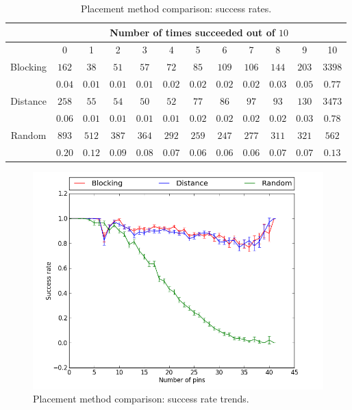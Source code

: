 \begin{table}[H]
\begin{center}
\begin{singlespace}
\begin{tabular}{|c||c|c|c|c|c|c|c|c|c|c|c|}
\hline
 & \multicolumn{11}{|c|}{Number of times succeeded out of $10$} \\
\hline
 & 0 & 1 & 2 & 3 & 4 & 5 & 6 & 7 & 8 & 9 & 10 \\
\hline\hline
Blocking & $162$ & $38$ & $51$ & $57$ & $72$ & $85$ & $109$ & $106$ & $144$ & $203$ & $3398$ \\
 & $0.04$ & $0.01$ & $0.01$ & $0.01$ & $0.02$ & $0.02$ & $0.02$ & $0.02$ & $0.03$ & $0.05$ & $0.77$ \\
\hline
 Distance & $258$ & $55$ & $54$ & $50$ & $52$ & $77$ & $86$ & $97$ & $93$ & $130$ & $3473$ \\
  & $0.06$ & $0.01$ & $0.01$ & $0.01$ & $0.01$ & $0.02$ & $0.02$ & $0.02$ & $0.02$ & $0.03$ & $0.78$ \\
\hline
  Random & $893$ & $512$ & $387$ & $364$ & $292$ & $259$ & $247$ & $277$ & $311$ & $321$ & $562$ \\
   & $0.20$ & $0.12$ & $0.09$ & $0.08$ & $0.07$ & $0.06$ & $0.06$ & $0.06$ & $0.07$ & $0.07$ & $0.13$ \\
\hline
\end{tabular}
\end{singlespace}
\end{center}
\label{tb:placement_success}
\caption{Placement method comparison: success rates.}
\end{table}

\begin{figure}[H]
\begin{center}
\includegraphics[width=\textwidth]{Images/placement_success_trend_comparison.png}
\caption{Placement method comparison: success rate trends.}
\label{fig:placement_success_trend}
\end{center}
\end{figure}

